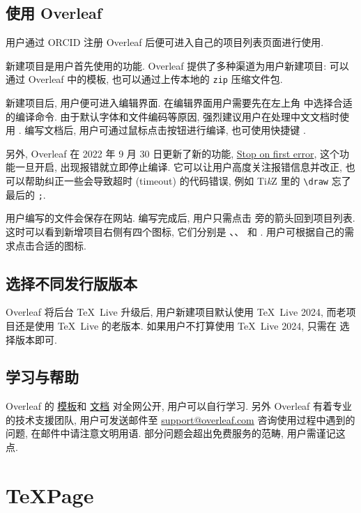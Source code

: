 \subsection{使用 Overleaf}

用户通过 ORCID 注册 Overleaf 后便可进入自己的项目列表页面进行使用.

新建项目是用户首先使用的功能.
Overleaf 提供了多种渠道为用户新建项目:
可以通过 Overleaf 中的模板,
也可以通过上传本地的 \texttt{zip} 压缩文件包.

新建项目后,
用户便可进入编辑界面.
在编辑界面用户需要先在左上角  中选择合适的编译命令.
由于默认字体和文件编码等原因,
强烈建议用户在处理中文文档时使用 .
编写文档后,
用户可通过鼠标点击按钮进行编译,
也可使用快捷键 .

另外,
Overleaf 在 2022 年 9 月 30 日更新了新的功能,
\href{https://www.overleaf.com/blog/new-feature-stop-on-first-error-compilation-mode}{Stop on first error},
这个功能一旦开启,
出现报错就立即停止编译.
它可以让用户高度关注报错信息并改正,
也可以帮助纠正一些会导致超时 (timeout) 的代码错误,
例如 Ti\textit kZ 里的 \verb+\draw+ 忘了最后的 \verb+;+.

用户编写的文件会保存在网站.
编写完成后,
用户只需点击  旁的箭头回到项目列表.
这时可以看到新增项目右侧有四个图标,
它们分别是 、、 和 .
用户可根据自己的需求点击合适的图标.

\subsection{选择不同发行版版本}

Overleaf 将后台 \TeX\ Live 升级后,
用户新建项目默认使用 \TeX\ Live 2024,
而老项目还是使用 \TeX\ Live 的老版本.
如果用户不打算使用 \TeX\ Live 2024,
只需在  选择版本即可.

\subsection{学习与帮助}

Overleaf 的%
\href{https://www.overleaf.com/latex/templates}{模板}和%
\href{https://www.overleaf.com/learn}{文档}%
对全网公开,
用户可以自行学习.
另外 Overleaf 有着专业的技术支援团队,
用户可发送邮件至 \href{mailto:support@overleaf.com}%
{\ttfamily support@overleaf.com}
咨询使用过程中遇到的问题,
在邮件中请注意文明用语.
部分问题会超出免费服务的范畴,
用户需谨记这点.

\section{TeXPage}

